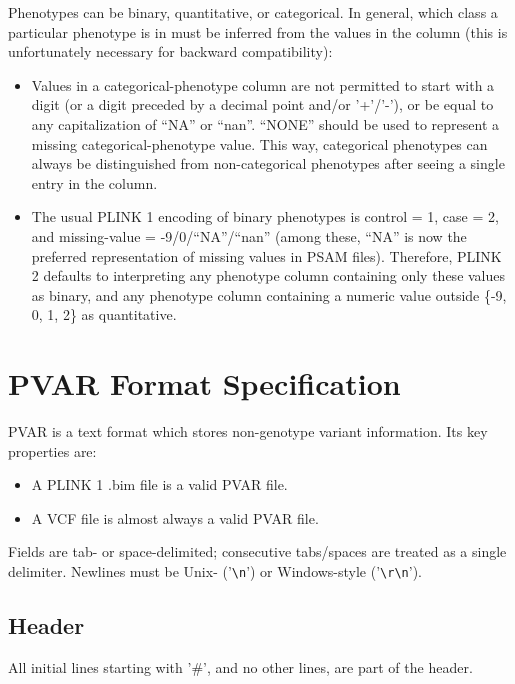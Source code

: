 \documentclass[8pt]{article}
\begin{document}
Phenotypes can be binary, quantitative, or categorical.  In general, which
class a particular phenotype is in must be inferred from the values in the
column (this is unfortunately necessary for backward compatibility):

\begin{itemize}
\item Values in a categorical-phenotype column are not permitted to start with
  a digit (or a digit preceded by a decimal point and/or '+'/'-'), or be equal
  to any capitalization of ``NA'' or ``nan''.  ``NONE'' should be used to
  represent a missing categorical-phenotype value.  This way, categorical
  phenotypes can always be distinguished from non-categorical phenotypes after
  seeing a single entry in the column.
\item The usual PLINK 1 encoding of binary phenotypes is control = 1, case = 2,
  and missing-value = -9/0/``NA''/``nan'' (among these, ``NA'' is now the
  preferred representation of missing values in PSAM files).  Therefore, PLINK
  2 defaults to interpreting any phenotype column containing only these values
  as binary, and any phenotype column containing a numeric value outside \{-9,
  0, 1, 2\} as quantitative.
\end{itemize}

\newpage
\section{PVAR Format Specification}

PVAR is a text format which stores non-genotype variant information.  Its key
properties are:

\begin{itemize}
\item A PLINK 1 .bim file is a valid PVAR file.
\item A VCF file is almost always a valid PVAR file.
\end{itemize}

Fields are tab- or space-delimited; consecutive tabs/spaces are treated as a
single delimiter.  Newlines must be Unix- ('\texttt{\textbackslash n}') or
Windows-style ('\texttt{\textbackslash r\textbackslash n}').

\subsection{Header}

All initial lines starting with '\#', and no other lines, are part of the
header.
\end{document}
